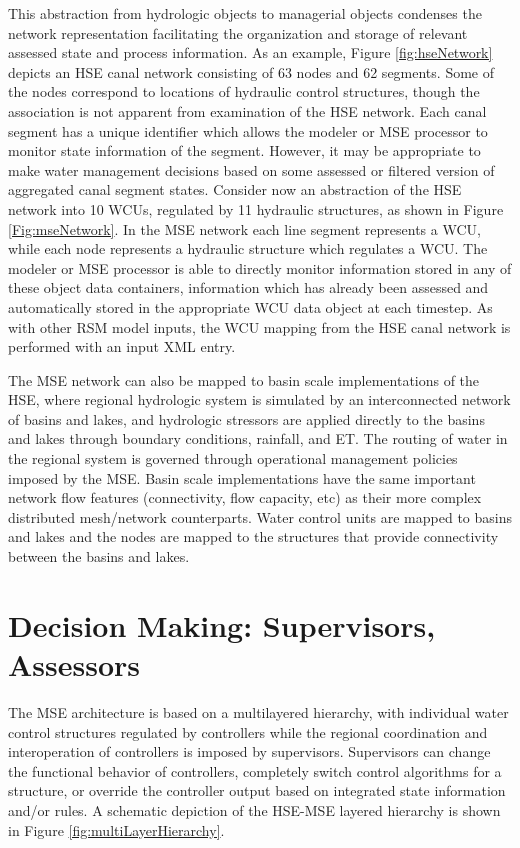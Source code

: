 This abstraction from hydrologic objects to managerial objects
condenses the network representation facilitating the organization and
storage of relevant assessed state and process information. As an
example, Figure \ref{fig:hseNetwork} depicts an HSE canal network
consisting of 63 nodes and 62 segments. Some of the nodes correspond
to locations of hydraulic control structures, though the association
is not apparent from examination of the HSE network. Each canal
segment has a unique identifier which allows the modeler or MSE
processor to monitor state information of the segment. However, it may
be appropriate to make water management decisions based on some
assessed or filtered version of aggregated canal segment states.
Consider now an abstraction of the HSE network into 10 WCUs, regulated
by 11 hydraulic structures, as shown in Figure
\ref{Fig:mseNetwork}. In the MSE network each line segment represents
a WCU, while each node represents a hydraulic structure which
regulates a WCU. The modeler or MSE processor is able to directly
monitor information stored in any of these object data containers,
information which has already been assessed and automatically stored
in the appropriate WCU data object at each timestep.  As with other
RSM model inputs, the WCU mapping from the HSE canal network is
performed with an input XML entry.

The MSE network can also be mapped to basin scale implementations of
the HSE, where regional hydrologic system is simulated by an
interconnected network of basins and lakes, and hydrologic stressors
are applied directly to the basins and lakes through boundary
conditions, rainfall, and ET. The routing of water in the regional
system is governed through operational management policies imposed by
the MSE.  Basin scale implementations have the same important network
flow features (connectivity, flow capacity, etc) as their more complex
distributed mesh/network counterparts.  Water control units are mapped
to basins and lakes and the nodes are mapped to the structures that
provide connectivity between the basins and lakes.

\section{Decision Making: Supervisors, Assessors}

The MSE architecture is based on a multilayered hierarchy, with
individual water control structures regulated by controllers while the
regional coordination and interoperation of controllers is imposed by
supervisors. Supervisors can change the functional behavior of
controllers, completely switch control algorithms for a structure, or
override the controller output based on integrated state information
and/or rules. A schematic depiction of the HSE-MSE layered hierarchy
is shown in Figure \ref{fig:multiLayerHierarchy}.  

